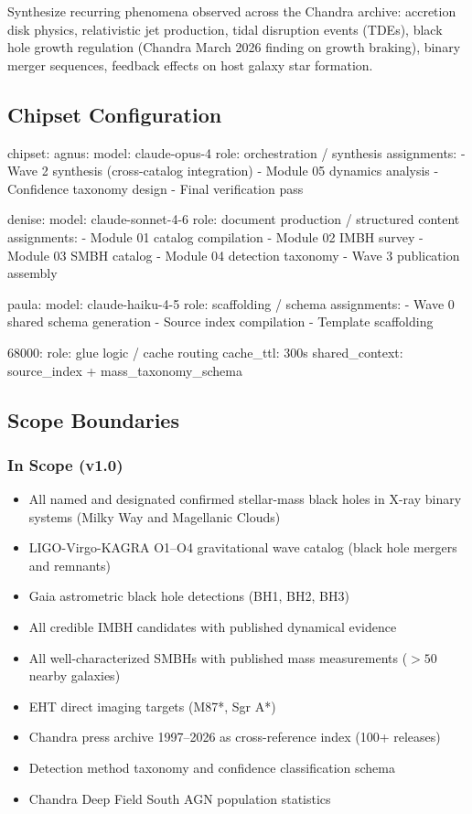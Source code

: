 \documentclass[11pt,letterpaper]{article}
\begin{document}
Synthesize recurring phenomena observed across the Chandra archive: accretion disk physics, relativistic jet production, tidal disruption events (TDEs), black hole growth regulation (Chandra March 2026 finding on growth braking), binary merger sequences, feedback effects on host galaxy star formation.

\subsection{Chipset Configuration}

\begin{asciibox}
chipset:
  agnus:
    model: claude-opus-4
    role: orchestration / synthesis
    assignments:
      - Wave 2 synthesis (cross-catalog integration)
      - Module 05 dynamics analysis
      - Confidence taxonomy design
      - Final verification pass

  denise:
    model: claude-sonnet-4-6
    role: document production / structured content
    assignments:
      - Module 01 catalog compilation
      - Module 02 IMBH survey
      - Module 03 SMBH catalog
      - Module 04 detection taxonomy
      - Wave 3 publication assembly

  paula:
    model: claude-haiku-4-5
    role: scaffolding / schema
    assignments:
      - Wave 0 shared schema generation
      - Source index compilation
      - Template scaffolding

  68000:
    role: glue logic / cache routing
    cache_ttl: 300s
    shared_context: source_index + mass_taxonomy_schema
\end{asciibox}

\subsection{Scope Boundaries}

\subsubsection{In Scope (v1.0)}

\begin{itemize}[leftmargin=1.5em]
  \item All named and designated confirmed stellar-mass black holes in X-ray binary systems (Milky Way and Magellanic Clouds)
  \item LIGO-Virgo-KAGRA O1--O4 gravitational wave catalog (black hole mergers and remnants)
  \item Gaia astrometric black hole detections (BH1, BH2, BH3)
  \item All credible IMBH candidates with published dynamical evidence
  \item All well-characterized SMBHs with published mass measurements ($>50$ nearby galaxies)
  \item EHT direct imaging targets (M87*, Sgr A*)
  \item Chandra press archive 1997--2026 as cross-reference index (100+ releases)
  \item Detection method taxonomy and confidence classification schema
  \item Chandra Deep Field South AGN population statistics
\end{itemize}
\end{document}
